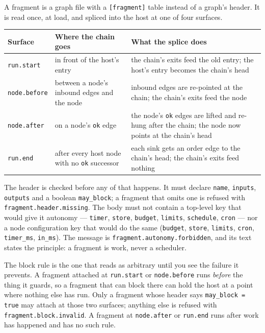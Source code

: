A fragment is a graph file with a \texttt{[fragment]} table instead of a graph's header. It is read
once, at load, and spliced into the host at one of four surfaces.

\begin{center}
\footnotesize
\begin{tabular}{@{}p{}p{}p{}@{}}
	\toprule
	\textbf{Surface} & \textbf{Where the chain goes} & \textbf{What the splice does} \\
	\midrule
	\texttt{run.start} & in front of the host's entry & the chain's exits feed the old entry; the
	host's entry becomes the chain's head \\
	\texttt{node.before} & between a node's inbound edges and the node & inbound edges are re-pointed
	at the chain; the chain's exits feed the node \\
	\texttt{node.after} & on a node's \texttt{ok} edge & the node's \texttt{ok} edges are lifted and
	re-hung after the chain; the node now points at the chain's head \\
	\texttt{run.end} & after every host node with no \texttt{ok} successor & each sink gets an order
	edge to the chain's head; the chain's exits feed nothing \\
	\bottomrule
\end{tabular}
\end{center}

The header is checked before any of that happens. It must declare \texttt{name},
\texttt{inputs}, \texttt{outputs} and a boolean \texttt{may\_block}; a fragment that omits one is
refused with \texttt{fragment.header.missing}. The body must not contain a top-level key that would
give it autonomy --- \texttt{timer}, \texttt{store}, \texttt{budget}, \texttt{limits},
\texttt{schedule}, \texttt{cron} --- nor a node configuration key that would do the same
(\texttt{budget}, \texttt{store}, \texttt{limits}, \texttt{cron}, \texttt{timer\_ms},
\texttt{in\_ms}). The message is \texttt{fragment.autonomy.forbidden}, and its text states the
principle: a fragment is work, never a scheduler.

The block rule is the one that reads as arbitrary until you see the failure it prevents. A fragment
attached at \texttt{run.start} or \texttt{node.before} runs \emph{before} the thing it guards, so a
fragment that can block there can hold the host at a point where nothing else has run. Only a
fragment whose header says \texttt{may\_block = true} may attach at those two surfaces; anything
else is refused with \texttt{fragment.block.invalid}. A fragment at \texttt{node.after} or
\texttt{run.end} runs after work has happened and has no such rule.

